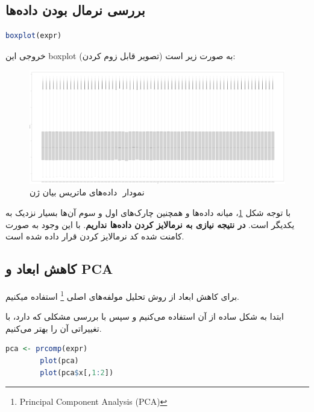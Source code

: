 \documentclass[12pt]{article}
\begin{document}
\subsection{بررسی نرمال بودن داده‌ها}



\begin{latin}
	\begin{lstlisting}[language=R]
		boxplot(expr)
	\end{lstlisting}
\end{latin}

خروجی این boxplot به صورت زیر است (تصویر قابل زوم کردن):
\begin{figure}[h!]

	\includegraphics[width = 1.0 \textwidth]{./Results/boxplot.pdf}
	\caption{نمودار ‌ داده‌های ماتریس بیان ژن}
		\label{fig:boxplot}
\end{figure}

با توجه شکل \ref{fig:boxplot}، میانه داده‌ها و همچنین چارک‌های اول و سوم آن‌ها بسیار نزدیک به یکدیگر است. \textbf{در نتیجه نیازی به نرمالایز کردن داده‌ها نداریم}. با این وجود به صورت کامنت شده کد نرمالایز کردن قرار داده شده است.


\subsection{کاهش ابعاد و PCA}

برای کاهش ابعاد از روش تحلیل مولفه‌های اصلی
\footnote{Principal Component Analysis (PCA)}
استفاده میکنیم.

ابتدا به شکل ساده از آن استفاده می‌کنیم و سپس با بررسی مشکلی که دارد، با تغییراتی آن را بهتر می‌کنیم.

\begin{latin}
	\begin{lstlisting}[language = R]
		pca <- prcomp(expr)
		plot(pca)
		plot(pca$x[,1:2])
	\end{lstlisting}
\end{latin}
\end{document}
